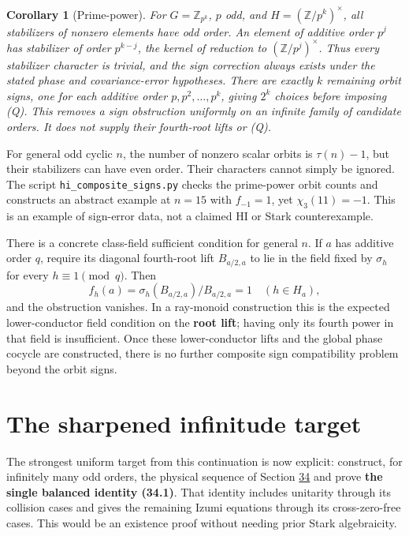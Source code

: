 \documentclass[11pt,reqno]{amsart}
\theoremstyle{plain}
\newtheorem{corollary}[theorem]{Corollary}
\begin{document}
\begin{corollary}[Prime-power]
For
\(G=\mathbb Z_{p^k}\), \(p\) odd, and
\(H=(\mathbb Z/p^k)^\times\), all stabilizers of nonzero
elements have odd order. An element of additive order \(p^j\)
has stabilizer of order \(p^{k-j}\), the kernel of reduction to
\((\mathbb Z/p^j)^\times\). Thus every stabilizer character is
trivial, and the sign correction always exists under the stated
phase and covariance-error hypotheses. There are exactly \(k\)
remaining orbit signs, one for each additive order
\(p,p^2,\ldots,p^k\), giving \(2^k\) choices before imposing (Q).
This removes a sign obstruction uniformly on an infinite family of
candidate orders. It does not supply their fourth-root lifts or (Q).
\end{corollary}

For general odd cyclic \(n\), the number of nonzero scalar orbits
is \(\tau(n)-1\), but their stabilizers can have even order. Their
characters cannot simply be ignored. The script
\texttt{hi\_\allowbreak composite\_\allowbreak signs.py} checks the prime-power orbit counts and
constructs an abstract example at \(n=15\) with
\(f_{-1}=1\), yet \(\chi_3(11)=-1\). This is an example of
sign-error data, not a claimed HI or Stark counterexample.

There is a concrete class-field sufficient condition for general
\(n\). If \(a\) has additive order \(q\), require its diagonal
fourth-root lift \(B_{a/2,a}\) to lie in the field fixed by
\(\sigma_h\) for every \(h\equiv1\pmod q\). Then
\[
 f_h(a)=\sigma_h(B_{a/2,a})/B_{a/2,a}=1
 \quad(h\in H_a),
\]
and the obstruction vanishes. In a ray-monoid construction this is
the expected lower-conductor field condition on the \textbf{root lift};
having only its fourth power in that field is insufficient. Once
these lower-conductor lifts and the global phase cocycle are
constructed, there is no further composite sign compatibility
problem beyond the orbit signs.

\section{The sharpened infinitude target}\label{sec:37}

The strongest uniform target from this continuation is now explicit:
construct, for infinitely many odd orders, the physical sequence of
Section \hyperref[sec:34]{34} and prove \textbf{the single balanced identity (34.1)}. That
identity includes unitarity through its collision cases and gives the
remaining Izumi equations through its cross-zero-free cases. This
would be an existence proof without needing prior Stark algebraicity.
\end{document}
